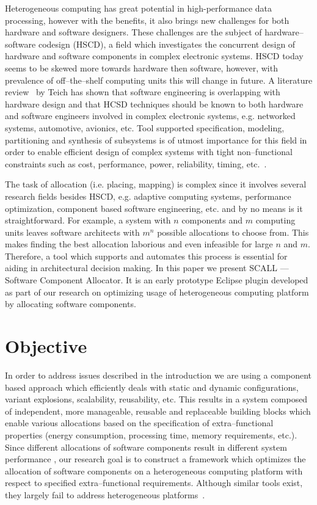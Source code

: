 \documentclass{sig-alternate}
\begin{document}
Heterogeneous computing has great potential in high\--per\-formance data processing, however with the benefits, it also brings new challenges for both hardware and software designers. These challenges are the subject of hardware--software codesign (HSCD), a field which investigates the concurrent design of hardware and software components in complex electronic systems. HSCD today seems to be skewed more towards hardware then software, however, with prevalence of off--the--shelf computing units this will change in future.
A literature review~\cite{teich2012hardware} by Teich has shown that software engineering is overlapping with hardware design and that HCSD techniques should be known to both hardware and software engineers involved in complex electronic systems, e.g. networked systems, automotive, avionics, etc. Tool supported specification, modeling, partitioning and synthesis of subsystems is of utmost importance for this field in order to enable efficient design of complex systems with tight non--functional constraints such as cost, performance, power, reliability, timing, etc.~\cite{6502240}.

The task of allocation (i.e. placing, mapping) is complex since it involves several research fields besides HSCD, e.g. adaptive computing systems, performance optimization, component based software engineering, etc. and by no means is it straightforward. For example, a system with $n$ components and $m$ computing units leaves software architects with $m^n$ possible allocations to choose from. This makes finding the best allocation laborious and even infeasible for large $n$ and $m$. Therefore, a tool which supports and automates this process is essential for aiding in architectural decision making. In this paper we present SCALL --- Software Component Allocator. It is an early prototype Eclipse plugin developed as part of our research on optimizing usage of heterogeneous computing platform by allocating software components.

\section{Objective}

In order to address issues described in the introduction we are using a component based approach which efficiently deals with static and dynamic configurations, variant explosions, scalability, reusability, etc. This results in a system composed of independent, more manageable, reusable and replaceable building blocks which enable various allocations based on the specification of extra--functional properties (energy consumption, processing time, memory requirements, etc.). Since different allocations of software components result in different system performance \cite{santinelli2010component}, our research goal is to construct a framework which optimizes the allocation of software components on a heterogeneous computing platform with respect to specified extra--functional requirements. Although similar tools exist, they largely fail to address heterogeneous platforms~\cite{Aleti2009, Malek2012, ccelik2013s}. 
\end{document}
